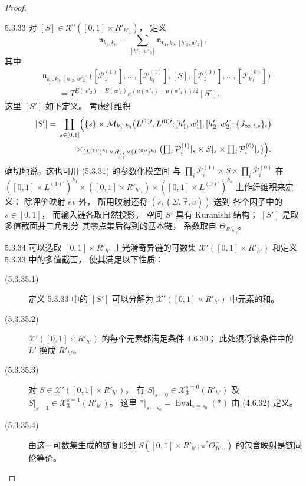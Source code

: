 \begin{proof}
\begin{definition}{5.3.33}\label{def:5-3-33}
对
$[S]\in\mathcal X'
([0,1]\times R'_{h'_1})$，
定义
\[
\mathfrak n_{k_1,k_0}
=\sum_{[h'_2,w'_2]}
\mathfrak n_{k_1,k_0;[h'_2,w'_2]},
\]
其中
\[
\begin{aligned}
&\mathfrak n_{k_1,k_0;[h'_2,w'_2]}
\bigl([\mathcal P_1^{(1)}],\ldots,
[\mathcal P_{k_1}^{(1)}],[S],
[\mathcal P_1^{(0)}],\ldots,
[\mathcal P_{k_0}^{(0)}]\bigr)\\
&\qquad=
T^{E(w'_2)-E(w'_1)}
e^{(\mu(w'_2)-\mu(w'_1))/2}[S'].
\end{aligned}
\]
这里 $[S']$ 如下定义。
考虑纤维积
\[
\begin{aligned}
|S'|={}&
\coprod_{s\in[0,1]}
\Bigl(\{s\}\times
\mathcal M_{k_1,k_0}
\bigl(L^{(1)\prime},L^{(0)\prime};
[h'_1,w'_1],[h'_2,w'_2];
\{J_{\infty,t,s}\}_t\bigr)\\
&\qquad\times_{
(L^{(1)\prime})^{k_1}
\times R'_{h'_1}
\times(L^{(0)\prime})^{k_0}}
\bigl(
\textstyle\prod_i\mathcal P_i^{(1)}|_s
\times S|_s
\times\prod_i\mathcal P_i^{(0)}|_s
\bigr)\Bigr).
\end{aligned}
\]
确切地说，这也可用
(5.3.31) 的参数化模空间
与 $\prod_i\mathcal P_i^{(1)}
\times S\times
\prod_i\mathcal P_i^{(0)}$
在
$([0,1]\times L^{(1)\prime})^{k_1}
\times([0,1]\times R'_{h'_1})
\times([0,1]\times L^{(0)\prime})^{k_0}$
上作纤维积来定义：
除评价映射 $ev$ 外，
所用映射还将
$(s,(\Sigma,\vec\tau,u))$ 送到
各个因子中的 $s\in[0,1]$，
而输入链各取自然投影。
空间 $S'$ 具有 Kuranishi 结构；
$[S']$ 是取多值截面并三角剖分
其零点集后得到的基本链，
系数取自 $\Theta^-_{R'_{h'_2}}$。
\end{definition}

\begin{lemma}{5.3.34}\label{lem:5-3-34}
可以选取
$[0,1]\times R'_{h'}$
上光滑奇异链的可数集
$\mathcal X'([0,1]\times R'_{h'})$
和定义 5.3.33 中的多值截面，
使其满足以下性质：
\begin{description}
\item[\textup{(5.3.35.1)}]\label{item:5-3-35-1}
定义 5.3.33 中的 $[S']$
可以分解为
$\mathcal X'([0,1]\times R'_{h'})$
中元素的和。
\item[\textup{(5.3.35.2)}]\label{item:5-3-35-2}
$\mathcal X'([0,1]\times R'_{h'})$
的每个元素都满足条件 4.6.30；
此处须将该条件中的 $L'$
换成 $R'_{h'}$。
\item[\textup{(5.3.35.3)}]\label{item:5-3-35-3}
对
$S\in\mathcal X'
([0,1]\times R'_{h'})$，
有
$S|_{s=0}\in\mathcal X_3^{s=0}(R'_{h'})$
及
$S|_{s=1}\in\mathcal X_3^{s=1}(R'_{h'})$。
这里
$*|_{s=s_0}
=\operatorname{Eval}_{s=s_0}(*)$
由 (4.6.32) 定义。
\item[\textup{(5.3.35.4)}]\label{item:5-3-35-4}
由这一可数集生成的链复形到
$S([0,1]\times R'_{h'};
\pi^*\Theta^-_{R'_{h'}})$
的包含映射是链同伦等价。
\end{description}
\end{lemma}


\end{proof}
